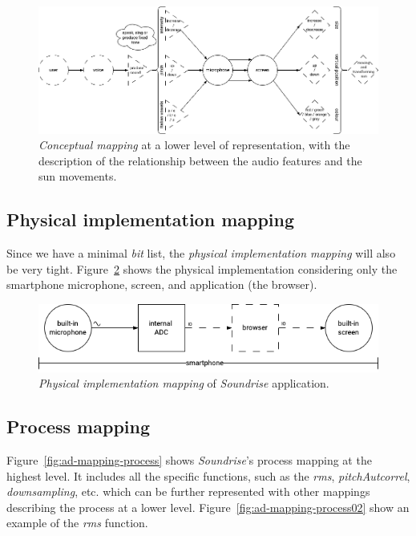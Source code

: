 \begin{figure}[!h]
    \centering
    \includegraphics[width=\linewidth]{chapters/appendix/d/image/graphd-mapping-conceptual02.drawio.png}
    \caption{\textit{Conceptual mapping} at a lower level of representation, with the description of the relationship between the audio features and the sun movements. }
    \label{fig:ad-mapping-conceptual02}
\end{figure}

\subsection*{Physical implementation mapping}
Since we have a minimal \textit{bit} list, the \textit{physical implementation mapping} will also be very tight. Figure~\ref{fig:ad-mapping-physical} shows the physical implementation considering only the smartphone microphone, screen, and application (the browser). 

\begin{figure}[!h]
    \centering
    \includegraphics[width=\linewidth]{chapters/appendix/d/image/graphd-mapping-physical.png}
    \caption{\textit{Physical implementation mapping} of \textit{Soundrise} application.}
    \label{fig:ad-mapping-physical}
\end{figure}

\subsection*{Process mapping}
Figure~\ref{fig:ad-mapping-process} shows \textit{Soundrise}’s process mapping at the highest level. It includes all the specific functions, such as the \textit{rms}, \textit{pitchAutcorrel}, \textit{downsampling}, etc. which can be further represented with other mappings describing the process at a lower level. Figure~\ref{fig:ad-mapping-process02} show an example of the \textit{rms} function.

